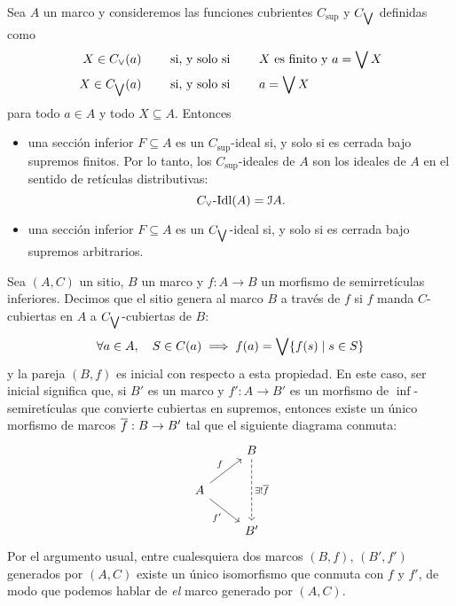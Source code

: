 \begin{example}
    Sea $A$ un marco y consideremos las funciones cubrientes
    $C_\sup$ y $C_{\bigvee}$ definidas como
    \begin{align*}
        X\in C_\vee(a)
        &\qquad\text{ si, y solo si }\qquad
        \text{$X$ es finito y } a=\bigvee X \\
        X\in C_{\bigvee}(a)
        &\qquad\text{ si, y solo si }\qquad
        a=\bigvee X 
    \end{align*}
    para todo $a\in A$ y todo $X\subseteq A$.
    Entonces
    \begin{itemize}
        \item
        una sección inferior $F\subseteq A$ es un
        $C_\sup$-ideal si, y solo si es cerrada bajo supremos
        finitos.
        Por lo tanto, los $C_\sup$-ideales de $A$
        son los ideales de $A$ en el sentido de retículas
        distributivas:
        \[
            C_\vee\text{-}\mathrm{Idl}(A) = \mathcal{I} A.
        \]
        \item
        una sección inferior $F\subseteq A$ es un
        $C_{\bigvee}$-ideal si, y solo si es cerrada bajo supremos
        arbitrarios.
    \end{itemize}
\end{example}

\begin{definition}
    Sea $(A,C)$ un sitio, $B$ un marco y $f:A\to B$ un morfismo de
    semirretículas inferiores. Decimos que el sitio genera al marco
    $B$ a través de $f$ si $f$ manda $C$-cubiertas en $A$ a
    $C_{\bigvee}$-cubiertas de $B$:
    \begin{equation*}
      \forall a\in A,\quad
        S\in C(a) \implies f(a) = \bigvee\{f(s)\mid s\in S\}
    \end{equation*}
    y la pareja $(B,f)$ es inicial con respecto a esta propiedad.
    En este caso, ser inicial significa que,
    si $B'$ es un marco y $f':A\to B'$ es un morfismo
    de $\inf$-semiretículas
    que convierte cubiertas en supremos,
    entonces existe un único morfismo de marcos
    $\overline{f}:B\to B'$ tal que el siguiente diagrama conmuta:
    \[
        \begin{tikzcd}[ampersand replacement=\&]
            \& B \arrow[dd, "\exists!\overline{f}", dashed] \\
            A \arrow[ru, "f"] \arrow[rd, "f'"'] \& \\
            \& B'                                          
        \end{tikzcd}
    \]
    Por el argumento usual, entre cualesquiera dos
    marcos $(B,f)$, $(B',f')$ generados por $(A,C)$ existe un único
    isomorfismo que conmuta con $f$ y $f'$,
    de modo que podemos hablar de \emph{el} marco generado
    por $(A,C)$.
\end{definition}

